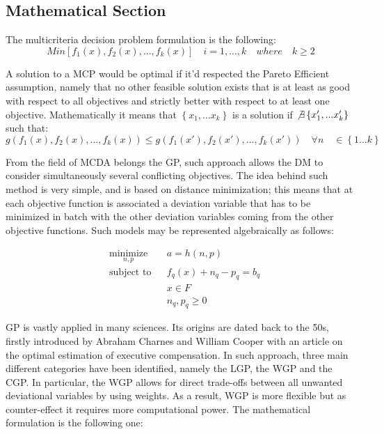\documentclass[a0,portrait]{a0poster}
\begin{document}
\begin{multicols}{2}
\subsection*{Mathematical Section}

The multicriteria decision problem formulation is the following: 
$$
Min[f_1(x),f_2(x),...,f_k(x)] \quad i=1,...,k \quad where \quad k\geq2
$$
	

A solution to a MCP would be optimal if it'd respected the Pareto Efficient assumption, namely that no other feasible solution exists that is at least as good with respect to all objectives and strictly better with respect to at least one objective. Mathematically it means that $\left\{x_1,...x_k\right\}$ is a solution if $\not\exists \left\{x'_1,...x'_k\right\}$
such that:
	\[
	g(f_1(x),f_2(x),...,f_k(x)) \leq g(f_1(x'),f_2(x'),...,f_k(x')) \quad \forall n \quad \in  \left\{1...k\right\}
	\]

	From the field of MCDA belongs the GP, such approach allows the DM to consider simultaneously several conflicting objectives. The idea behind such method is very simple, and is based on distance minimization; this means that at each objective function is associated a deviation variable that has to be minimized in batch with the other deviation variables coming from the other objective functions. Such models may be represented algebraically as follows:

\begin{equation*}
\begin{aligned}
& \underset{n,p}{\text{minimize}}
& & a=h(n,p) \\
& \text{subject to}
& & f_q(x)+n_q-p_q=b_q \\
& & & x\in F \\
& & & n_q,p_q\geq 0 
\end{aligned}
\end{equation*}

GP is vastly applied in many sciences\cite{Tamiz1998}. Its origins are dated back to the 50s, firstly introduced by Abraham Charnes and William Cooper\cite{Charnes1955} with an article on the optimal estimation of executive compensation. In such approach, three main different categories have been identified, namely the LGP, the WGP and the CGP.
In particular, the WGP allows for direct trade-offs between all unwanted deviational variables by using weights. As a result, WGP is more flexible but as counter-effect it requires more computational power. The mathematical formulation is the following one:


\end{multicols}
\end{document}
